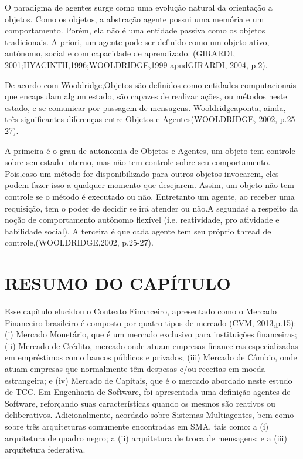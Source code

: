 O paradigma de agentes surge como uma evolução natural da orientação a objetos. Como os objetos, a abstração agente possui uma memória e um comportamento. Porém, ela não é uma entidade passiva como os objetos tradicionais. A priori, um agente pode ser definido como um objeto ativo, autônomo, social e com capacidade de aprendizado. 
(GIRARDI, 2001;HYACINTH,1996;WOOLDRIDGE,1999 apudGIRARDI, 2004, p.2).

De acordo com Wooldridge,Objetos são definidos como entidades computacionais que encapsulam algum estado, são capazes de realizar ações, ou métodos neste estado, e se comunicar por passagem de mensagens. Wooldridgeaponta, ainda, três significantes diferenças entre Objetos e Agentes(WOOLDRIDGE, 2002, p.25-27). 

A primeira é o grau de autonomia de Objetos e Agentes, um objeto tem controle sobre seu estado interno, mas não tem controle sobre seu comportamento. Pois,caso um método for disponibilizado para outros objetos invocarem, eles podem fazer isso a qualquer momento que desejarem. Assim, um objeto não tem controle se o método é executado ou não. Entretanto um agente, ao receber uma requisição, tem o poder de decidir se irá atender ou não.A segundaé a respeito da noção de comportamento autônomo flexível (i.e. reatividade, pro atividade e habilidade social). A terceira é que cada agente tem seu próprio thread de controle,(WOOLDRIDGE,2002, p.25-27).


\section{RESUMO DO CAPÍTULO}

Esse capítulo elucidou o Contexto Financeiro, apresentado como o Mercado Financeiro brasileiro é composto por quatro tipos de mercado (CVM, 2013,p.15): (i) Mercado Monetário, que é um mercado exclusivo para instituições financeiras; (ii) Mercado de Crédito, mercado onde atuam empresas financeiras especializadas em empréstimos como bancos públicos e privados; (iii) Mercado de Câmbio, onde atuam empresas que normalmente têm despesas e/ou receitas em moeda estrangeira; e (iv) Mercado de Capitais, que é o mercado abordado neste estudo de TCC. Em Engenharia de Software, foi apresentada uma definição agentes de Software, reforçando suas características quando os mesmos são reativos ou deliberativos. Adicionalmente, acordado sobre Sistemas Multiagentes, bem como sobre três arquiteturas comumente encontradas em SMA, tais como: a (i) arquitetura de quadro negro; a (ii) arquitetura de troca de mensagens; e a (iii) arquitetura federativa.

